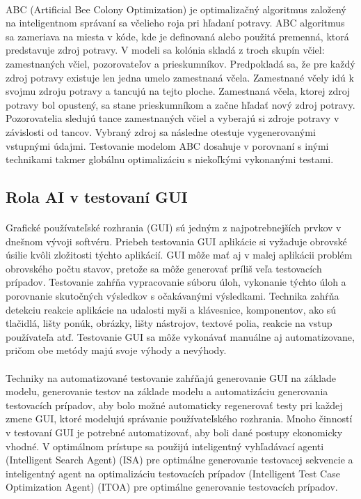 \documentclass[10pt,twoside,slovak,a4paper]{article}
\begin{document}
\paragraph{}
ABC (Artificial Bee Colony Optimization) je optimalizačný algoritmus založený na inteligentnom správaní sa včelieho roja pri hľadaní potravy. ABC algoritmus sa zameriava na miesta v kóde, kde je definovaná alebo použitá premenná, ktorá predstavuje zdroj potravy. V modeli sa kolónia skladá z troch skupín včiel: zamestnaných včiel, pozorovateľov a prieskumníkov. Predpokladá sa, že pre každý zdroj potravy existuje len jedna umelo zamestnaná včela. Zamestnané včely idú k svojmu zdroju potravy a tancujú na tejto ploche. Zamestnaná včela, ktorej zdroj potravy bol opustený, sa stane prieskumníkom a začne hľadať nový zdroj potravy. Pozorovatelia sledujú tance zamestnaných včiel a vyberajú si zdroje potravy v závislosti od tancov. Vybraný zdroj sa následne otestuje vygenerovanými vstupnými údajmi. Testovanie modelom ABC dosahuje v porovnaní s inými technikami takmer globálnu optimalizáciu s niekoľkými vykonanými testami. \cite{7542311}

\subsection{Rola AI v testovaní GUI} \label{rola ai v gui}
\paragraph{}
Grafické používateľské rozhrania (GUI) sú jedným z najpotrebnejších prvkov v dnešnom vývoji softvéru. Priebeh testovania GUI aplikácie si vyžaduje obrovské úsilie kvôli zložitosti týchto aplikácií. GUI môže mať aj v malej aplikácii problém obrovského počtu stavov, pretože sa môže generovať príliš veľa testovacích prípadov. Testovanie zahŕňa vypracovanie súboru úloh, vykonanie týchto úloh a porovnanie skutočných výsledkov s očakávanými výsledkami. Technika zahŕňa detekciu reakcie aplikácie na udalosti myši a klávesnice, komponentov, ako sú tlačidlá, lišty ponúk, obrázky, lišty nástrojov, textové polia, reakcie na vstup používateľa atď. Testovanie GUI sa môže vykonávať manuálne aj automatizovane, pričom obe metódy majú svoje výhody a nevýhody.\cite{6926420} \\
\paragraph{}
Techniky na automatizované testovanie zahŕňajú generovanie GUI na základe modelu, generovanie testov na základe modelu a automatizáciu generovania testovacích prípadov, aby bolo možné automaticky regenerovať testy pri každej zmene GUI, ktoré modelujú správanie používateľského rozhrania. Mnoho činností v testovaní GUI je potrebné automatizovať, aby boli dané postupy ekonomicky vhodné. V optimálnom prístupe sa použijú inteligentný vyhľadávací agenti (Intelligent Search Agent) (ISA) pre optimálne generovanie testovacej sekvencie a inteligentný agent na optimalizáciu testovacích prípadov (Intelligent Test Case Optimization Agent) (ITOA) pre optimálne generovanie testovacích prípadov.\cite{6926420}
\end{document}
